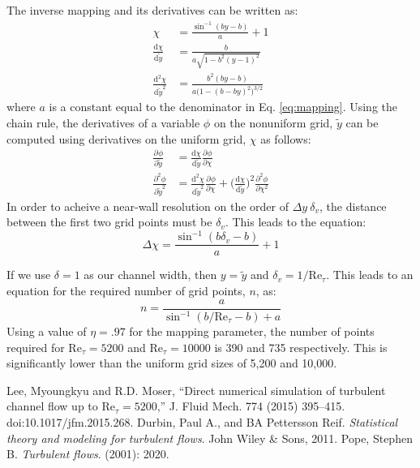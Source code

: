 \documentclass[a4paper,11pt]{article}
\newcommand{\pderiv}[3][]{%
  \ensuremath{\frac{\partial^{#1} {#2}}{\partial {#3}^{#1}}}}
\begin{document}
The inverse mapping and its derivatives can be written as:
\begin{align}
  \chi &= \frac{\sin^{-1}(by-b)}{a} + 1 \\
  \frac{\mathrm{d}\chi}{\mathrm{d}\tilde{y}} &= \frac{b}{a \sqrt{1-b^2(y-1)^2}} \label{eq:chi-y-1} \\
  \frac{\mathrm{d}^2\chi}{\mathrm{d}\tilde{y}^2} &= \frac{b^2(by-b)}{a\big(1-(b-by)^2\big)^{3/2}} \label{eq:chi-y-2}
\end{align}
where $a$ is a constant equal to the denominator in Eq. \ref{eq:mapping}.  Using the chain rule, the derivatives of a variable $\phi$ on the nonuniform grid, $\tilde{y}$ can be computed using derivatives on the uniform grid, $\chi$ as follows:
\begin{align}
 \pderiv{\phi}{\tilde{y}} &= \frac{\mathrm{d}\chi}{\mathrm{d}\tilde{y}} \pderiv{\phi}{\chi} \label{eq:phi-y-1} \\
 \pderiv[2]{\phi}{\tilde{y}} &= \frac{\mathrm{d}^2\chi}{\mathrm{d}\tilde{y}^2} \pderiv{\phi}{\chi} + \Big(\frac{\mathrm{d}\chi}{\mathrm{d}\tilde{y}} \Big)^2 \pderiv[2]{\phi}{\chi}  \label{eq:phi-y-2} 
\end{align}
In order to acheive a near-wall resolution on the order of $\Delta y ~ \delta_v$, the distance between the first two grid points must be $\delta_v$.  This leads to the equation:
\begin{equation}
 \Delta \chi = \frac{\sin^{-1}(b\delta_v -b)}{a}+1
\end{equation}

If we use $\delta = 1$ as our channel width, then $y = \tilde{y}$ and $\delta_v = 1/\mathrm{Re}_{\tau}$.  This leads to an equation for the required number of grid points, $n$, as:
\begin{equation}
 n = \frac{a}{\sin^{-1}(b/\mathrm{Re}_{\tau}-b)+a}
\end{equation}
Using a value of $\eta = .97$ for the mapping parameter, the number of points required for $\mathrm{Re}_{\tau}=5200$ and $\mathrm{Re}_{\tau}=10000$ is 390 and 735 respectively. This is significantly lower than the uniform grid sizes of 5,200 and 10,000.





\clearpage
\begin{thebibliography}{3}
Lee, Myoungkyu and R.D. Moser, ``Direct numerical simulation of turbulent channel flow up to $\mathrm{Re}_{\tau}=5200$,'' J. Fluid Mech. 774 (2015) 395–415. doi:10.1017/jfm.2015.268.
    Durbin, Paul A., and BA Pettersson Reif. \textit{Statistical theory and
modeling for turbulent flows}. John Wiley \& Sons, 2011.
        Pope, Stephen B. \textit{Turbulent flows}. (2001): 2020.
 
\newpage



\end{thebibliography}
\end{document}
